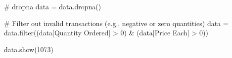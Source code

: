 \documentclass[
  letterpaper,
  DIV=11,
  numbers=noendperiod]{scrartcl}
\newenvironment{Shaded}{\begin{snugshade}}{\end{snugshade}}
\newcommand{\BuiltInTok}[1]{\textcolor[rgb]{0.00,0.23,0.31}{#1}}
\newcommand{\CommentTok}[1]{\textcolor[rgb]{0.37,0.37,0.37}{#1}}
\newcommand{\DecValTok}[1]{\textcolor[rgb]{0.68,0.00,0.00}{#1}}
\newcommand{\NormalTok}[1]{\textcolor[rgb]{0.00,0.23,0.31}{#1}}
\newcommand{\OperatorTok}[1]{\textcolor[rgb]{0.37,0.37,0.37}{#1}}
\newcommand{\StringTok}[1]{\textcolor[rgb]{0.13,0.47,0.30}{#1}}
\begin{document}
\begin{Shaded}
\begin{Highlighting}[]
\CommentTok{\# dropna}
\NormalTok{data }\OperatorTok{=}\NormalTok{ data.dropna()}

\CommentTok{\# Filter out invalid transactions (e.g., negative or zero quantities)}
\NormalTok{data }\OperatorTok{=}\NormalTok{ data.}\BuiltInTok{filter}\NormalTok{((data[}\StringTok{\textquotesingle{}\textasciigrave{}Quantity Ordered\textasciigrave{}\textquotesingle{}}\NormalTok{] }\OperatorTok{\textgreater{}} \DecValTok{0}\NormalTok{) }\OperatorTok{\&}\NormalTok{ (data[}\StringTok{\textquotesingle{}\textasciigrave{}Price Each\textasciigrave{}\textquotesingle{}}\NormalTok{] }\OperatorTok{\textgreater{}} \DecValTok{0}\NormalTok{))}

\NormalTok{data.show(}\DecValTok{1073}\NormalTok{)}
\end{Highlighting}
\end{Shaded}
\end{document}
